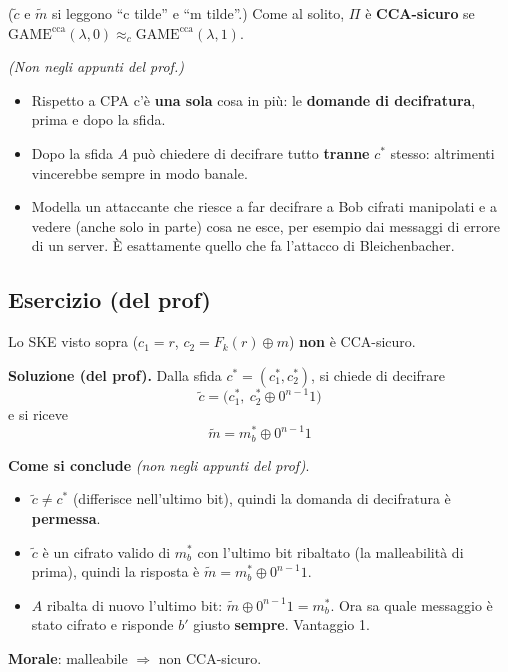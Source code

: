(\(\tilde{c}\) e \(\tilde{m}\) si leggono ``c tilde'' e ``m tilde''.) Come al solito, \(\Pi\) è \textbf{CCA-sicuro} se \(\text{GAME}^{\text{cca}}(\lambda, 0) \approx_c \text{GAME}^{\text{cca}}(\lambda, 1)\).

\begin{nota}
\emph{(Non negli appunti del prof.)}
\begin{itemize}
  \item Rispetto a CPA c'è \textbf{una sola} cosa in più: le \textbf{domande di decifratura}, prima e dopo la sfida.
  \item Dopo la sfida \(A\) può chiedere di decifrare tutto \textbf{tranne} \(c^*\) stesso: altrimenti vincerebbe sempre in modo banale.
  \item Modella un attaccante che riesce a far decifrare a Bob cifrati manipolati e a vedere (anche solo in parte) cosa ne esce, per esempio dai messaggi di errore di un server. È esattamente quello che fa l'attacco di Bleichenbacher.
\end{itemize}
\end{nota}

\subsection{Esercizio (del prof)}

Lo SKE visto sopra (\(c_1 = r\), \(c_2 = F_k(r) \oplus m\)) \textbf{non} è CCA-sicuro.

\textbf{Soluzione (del prof).} Dalla sfida \(c^* = (c_1^*, c_2^*)\), si chiede di decifrare
\[
\tilde{c} = \big(c_1^*,\ c_2^* \oplus 0^{n-1}1\big)
\]
e si riceve
\[
\tilde{m} = m_b^* \oplus 0^{n-1}1
\]

\begin{nota}
\textbf{Come si conclude} \emph{(non negli appunti del prof)}.
\begin{itemize}
  \item \(\tilde{c} \ne c^*\) (differisce nell'ultimo bit), quindi la domanda di decifratura è \textbf{permessa}.
  \item \(\tilde{c}\) è un cifrato valido di \(m_b^*\) con l'ultimo bit ribaltato (la malleabilità di prima), quindi la risposta è \(\tilde{m} = m_b^* \oplus 0^{n-1}1\).
  \item \(A\) ribalta di nuovo l'ultimo bit: \(\tilde{m} \oplus 0^{n-1}1 = m_b^*\). Ora sa quale messaggio è stato cifrato e risponde \(b'\) giusto \textbf{sempre}. Vantaggio 1.
\end{itemize}
\textbf{Morale}: malleabile \(\Rightarrow\) non CCA-sicuro.
\end{nota}

